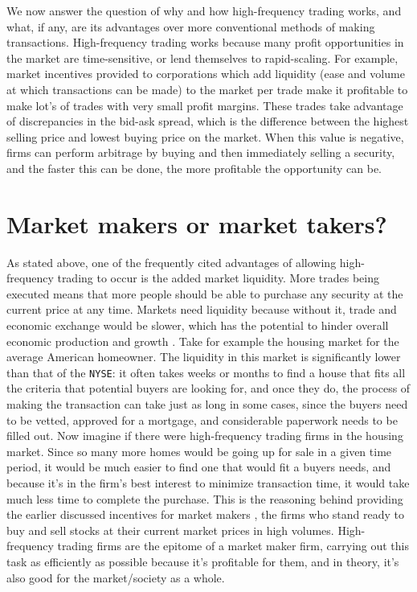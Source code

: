 \documentclass[12pt,oneside,reqno]{amsart}
\theoremstyle{plain}
\theoremstyle{definition}
\theoremstyle{remark}
\newcommand{\inlinecode}{\texttt}
\begin{document}
We now answer the question of why and how high-frequency trading works, and what, if any, are its advantages over more conventional methods of making transactions. High-frequency trading works because many profit opportunities in the market are time-sensitive, or lend themselves to rapid-scaling. For example, market incentives provided to corporations which add liquidity (ease and volume at which transactions can be made) to the market per trade make it profitable to make lot's of trades with very small profit margins. These trades take advantage of discrepancies in the bid-ask spread, which is the difference between the highest selling price and lowest buying price on the market. When this value is negative, firms can perform arbitrage by buying and then immediately selling a security, and the faster this can be done, the more profitable the opportunity can be. 

\section{Market makers or market takers?}

As stated above, one of the frequently cited advantages of allowing high-frequency trading to occur is the added market liquidity. More trades being executed means that more people should be able to purchase any security at the current price at any time. Markets need liquidity because without it, trade and economic exchange would be slower, which has the potential to hinder overall economic production and growth \cite{smith_2017}. Take for example the housing market for the average American homeowner. The liquidity in this market is significantly lower than that of the \inlinecode{NYSE}: it often takes weeks or months to find a house that fits all the criteria that potential buyers are looking for, and once they do, the process of making the transaction can take just as long in some cases, since the buyers need to be vetted, approved for a mortgage, and considerable paperwork needs to be filled out. Now imagine if there were high-frequency trading firms in the housing market. Since so many more homes would be going up for sale in a given time period, it would be much easier to find one that would fit a buyers needs, and because it's in the firm's best interest to minimize transaction time, it would take much less time to complete the purchase. This is the reasoning behind providing the earlier discussed incentives for market makers \cite{sec_2000}, the firms who stand ready to buy and sell stocks at their current market prices in high volumes. High-frequency trading firms are the epitome of a market maker firm, carrying out this task as efficiently as possible because it's profitable for them, and in theory, it's also good for the market/society as a whole. 
\end{document}
